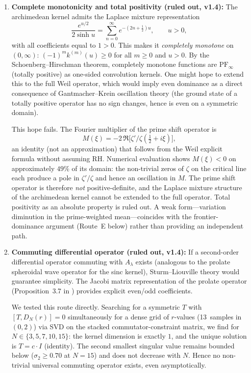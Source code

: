\documentclass[12pt,a4paper]{article}
\theoremstyle{definition}
\theoremstyle{remark}
\begin{document}
\begin{enumerate}[label=(\Alph*)]
  \item \textbf{Complete monotonicity and total positivity (ruled out, v1.4):} The archimedean kernel admits the Laplace mixture representation
  \[ \frac{e^{u/2}}{2\sinh u} = \sum_{n=0}^\infty e^{-(2n+\frac{1}{2})u}, \qquad u > 0, \]
  with all coefficients equal to $1 > 0$. This makes it \emph{completely monotone} on $(0,\infty)$: $(-1)^m k^{(m)}(u) \geq 0$ for all $m \geq 0$ and $u > 0$. By the Schoenberg--Hirschman theorem, completely monotone functions are $\mathrm{PF}_\infty$ (totally positive) as one-sided convolution kernels. One might hope to extend this to the full Weil operator, which would imply even dominance as a direct consequence of Gantmacher--Krein oscillation theory (the ground state of a totally positive operator has no sign changes, hence is even on a symmetric domain).

  This hope fails. The Fourier multiplier of the prime shift operator is
  \[ M(\xi) = -2\,\Re\!\bigl[\zeta'/\zeta(\tfrac{1}{2}+i\xi)\bigr], \]
  an identity (not an approximation) that follows from the Weil explicit formula without assuming RH. Numerical evaluation shows $M(\xi) < 0$ on approximately $49\%$ of its domain: the non-trivial zeros of $\zeta$ on the critical line each produce a pole in $\zeta'/\zeta$ and hence an oscillation in $M$. The prime shift operator is therefore \emph{not} positive-definite, and the Laplace mixture structure of the archimedean kernel cannot be extended to the full operator. Total positivity as an absolute property is ruled out. A weak form---variation diminution in the prime-weighted mean---coincides with the frontier-dominance argument (Route~E below) rather than providing an independent path.

  \item \textbf{Commuting differential operator (ruled out, v1.4):} If a second-order differential operator commuting with $A_\lambda$ exists (analogous to the prolate spheroidal wave operator for the sinc kernel), Sturm--Liouville theory would guarantee simplicity. The Jacobi matrix representation of the prolate operator (Proposition~3.7 in \cite{ConnesMoscovici2023}) provides explicit even/odd coefficients.

  We tested this route directly. Searching for a symmetric $T$ with $[T, D_N(r)] = 0$ simultaneously for a dense grid of $r$-values (13~samples in $(0,2)$) via SVD on the stacked commutator-constraint matrix, we find for $N \in \{3, 5, 7, 10, 15\}$: the kernel dimension is exactly $1$, and the unique solution is $T = c \cdot I$ (identity). The second smallest singular value remains bounded below ($\sigma_2 \geq 0.70$ at $N = 15$) and does not decrease with $N$. Hence no non-trivial universal commuting operator exists, even asymptotically.


\end{enumerate}
\end{document}

